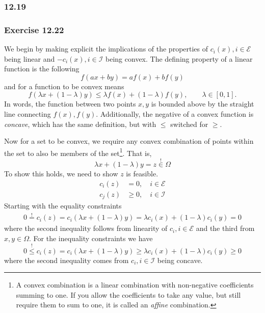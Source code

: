 \subsubsection{12.19}

\subsubsection{Exercise 12.22}
We begin by making explicit the implications of the properties of $c_i(x), i\in\mathcal{E}$ being linear and $-c_i(x), i\in\mathcal{I}$ being convex.
The defining property of a linear function is the following
\[
    f(ax + by) = af(x) + bf(y)
\]
and for a function to be convex means
\[
    f(\lambda x + (1-\lambda)y) \leq \lambda f(x) + (1 - \lambda) f(y),\qquad \lambda \in [0,1].
\]
In words, the function between two points $x,y$ is bounded above by the straight line connecting $f(x), f(y)$.
Additionally, the negative of a convex function is \textit{concave}, which has the same definition, but with $\leq$ switched for $\geq$.

Now for a set to be convex, we require any convex combination of points within the set to also be members of the set\footnote{A convex combination is a linear combination with non-negative coefficients summing to one. If you allow the coefficients to take any value, but still require them to sum to one, it is called an \textit{affine} combination.}.
That is,
\[
    \lambda x + (1 - \lambda)y = z \overset{!}{\in} \Omega
\]
To show this holds, we need to show $z$ is feasible.
\begin{align*}
    c_i(z) & = 0,\quad i\in\mathcal{E}     \\
    c_j(z) & \geq 0, \quad i\in\mathcal{I}
\end{align*}
Starting with the equality constraints
\begin{align*}
    0 \overset{!}{=} c_i(z) = c_i(\lambda x + (1-\lambda)y) = \lambda c_i(x) + (1-\lambda)c_i(y) = 0
\end{align*}
where the second inequality follows from linearity of $c_i, i\in\mathcal{E}$ and the third from $x,y\in\Omega$.
For the inequality constraints we have
\[
    0 \overset{!}{\leq} c_i(z) = c_i(\lambda x + (1-\lambda)y) \geq \lambda c_i(x) + (1-\lambda)c_i(y) \geq 0
\]
where the second inequality comes from $c_i, i \in \mathcal{I}$ being concave. \hfill\sq